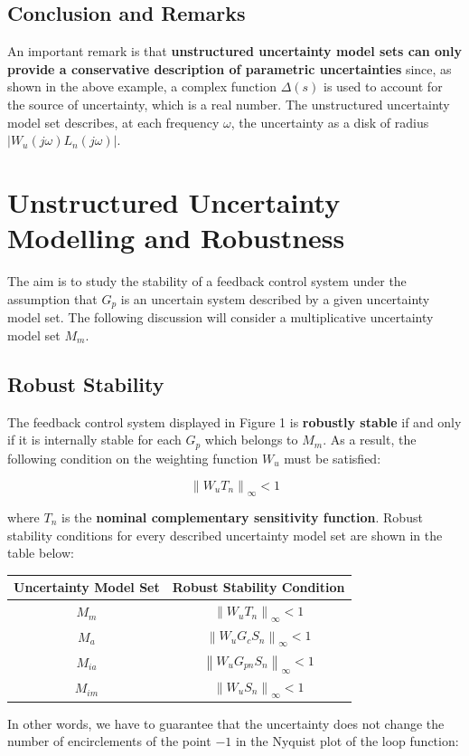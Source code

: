 \documentclass[a4paper,10pt,titlepage]{article}
\numberwithin{equation}{subsection}
\begin{document}
	\subsection{Conclusion and Remarks}
	An important remark is that \textbf{unstructured uncertainty model sets can only provide a conservative description of parametric uncertainties} since, as shown in the above example, a complex function $\Delta(s)$ is used to account for the source of uncertainty, which is a real number.
	The unstructured uncertainty model set describes, at each frequency $\omega$, the uncertainty as a disk of radius $\left| W_u(j\omega)L_n(j\omega) \right|$.
	
	\section{Unstructured Uncertainty Modelling and Robustness}
	The aim is to study the stability of a feedback control system under the assumption that $G_p$ is an uncertain system described by a given uncertainty model set. The following discussion will consider a multiplicative uncertainty model set $M_m$.
	
	\subsection{Robust Stability}
	The feedback control system displayed in Figure 1 is \textbf{robustly stable} if and only if it is internally stable for each $G_p$ which belongs to $M_m$.
	As a result, the following condition on the weighting function $W_u$ must be satisfied:
	
	\begin{equation}
		\left\lVert W_uT_n \right\rVert_\infty < 1
	\end{equation} 
	
	where $T_n$ is the \textbf{nominal complementary sensitivity function}.
	Robust stability conditions for every described uncertainty model set are shown in the table below:
	\begin{center}
		\vspace{2pt}
		\begin{tabular}{|c|c|}
			\hline
			\textbf{Uncertainty Model Set} & \textbf{Robust Stability Condition} \\ \hline
			$M_m$ & $\left\lVert W_uT_n \right\rVert_\infty < 1$ \\ \hline
			$M_a$ & $\left\lVert W_uG_cS_n \right\rVert_\infty < 1$ \\ \hline
			$M_{ia}$ & $\left\lVert W_uG_{pn}S_n \right\rVert_\infty < 1$ \\ \hline
			$M_{im}$ & $\left\lVert W_uS_n \right\rVert_\infty < 1$ \\ \hline
		\end{tabular}
	\end{center}
	In other words, we have to guarantee that the uncertainty does not change the number of encirclements of the point $-1$ in the Nyquist plot of the loop function:
	
\end{document}

